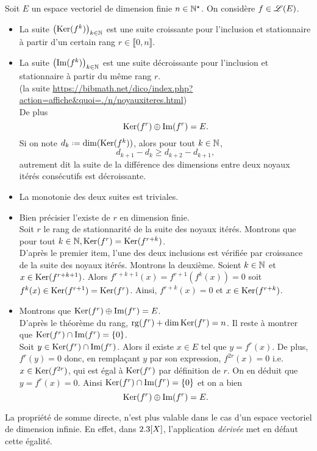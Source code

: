 \begin{prop}
    Soit $E$ un espace vectoriel de dimension finie $n \in \mathbb{N}^\star$. On considère $f \in \mathscr{L}(E)$.
    \begin{itemize}
        \item La suite $\left( \mathrm{Ker}(f^k) \right)_{k \in \mathbb{N}}$ est une suite croissante pour l'inclusion et stationnaire à partir d'un certain rang $r \in \llbracket 0, n \rrbracket$.
        \item La suite $\left( \Im(f^k) \right)_{k \in \mathbb{N}}$ est une suite décroissante pour l'inclusion et stationnaire à partir du même rang $r$. \\
        (la suite \url{https://bibmath.net/dico/index.php?action=affiche&quoi=./n/noyauxiteres.html}) \\De plus
        $$\mathrm{Ker}(f^r) \oplus \Im(f^r) = E.$$
        Si on note $d_k \defeq \dim(\Ker(f^k))$, alors pour tout $k \in \mathbb{N}$, 
        $$d_{k+1} - d_k \geqslant d_{k+2} - d_{k+1},$$
        autrement dit la suite de la différence des dimensions entre deux noyaux itérés consécutifs est décroissante. 
    \end{itemize}
\end{prop} 
\begin{preuve}
    \begin{itemize}
        \item La monotonie des deux suites est triviales. 
        \item Bien précisier l'existe de $r$ en dimension finie. \\
        Soit $r$ le rang de stationnarité de la suite des noyaux itérés. Montrons que pour tout $k \in \mathbb{N}, \mathrm{Ker}(f^r) = \mathrm{Ker}(f^{r+k})$. \\
        D'après le premier item, l'une des deux inclusions est vérifiée par croissance de la suite des noyaux itérés. Montrons la deuxième. Soient $k \in \mathbb{N}$ et $x \in \mathrm{Ker}(f^{r+k+1})$. Alors $f^{r+k+1}(x) = f^{r+1}(f^k(x)) = 0$ soit $f^k(x) \in \mathrm{Ker}(f^{r+1}) = \mathrm{Ker}(f^r)$. Ainsi, $f^{r+k}(x) = 0$ et $x \in \mathrm{Ker}(f^{r+k})$.
        \item Montrons que $\mathrm{Ker}(f^r) \oplus \Im(f^r) = E$. \\
        D'après le théorème du rang, $\mathrm{rg}(f^r) + \dim \mathrm{Ker}(f^r) = n$. Il reste à montrer que $\mathrm{Ker}(f^r) \cap \Im(f^r) = \{ 0 \}$. \\
        Soit $y \in \mathrm{Ker}(f^r) \cap \Im(f^r)$. Alors il existe $x \in E$ tel que $y = f^r(x)$. De plus, $f^r(y) = 0$ donc, en remplaçant $y$ par son expression, $f^{2r}(x) = 0$ i.e. $x \in \mathrm{Ker}(f^{2r})$, qui est égal à $\mathrm{Ker}(f^r)$ par définition de $r$. On en déduit que $y = f^r(x) = 0$. Ainsi $\mathrm{Ker}(f^r) \cap \Im(f^r) = \{ 0 \}$ et on a bien
        $$\mathrm{Ker}(f^r) \oplus \Im(f^r) = E.$$
    \end{itemize}
\end{preuve}

\begin{remarque}
    La propriété de somme directe, n'est plus valable dans le cas d'un espace vectoriel de dimension infinie. En effet, dans $2.3[X]$, l'application \emph{dérivée} met en défaut cette égalité. 
\end{remarque}




